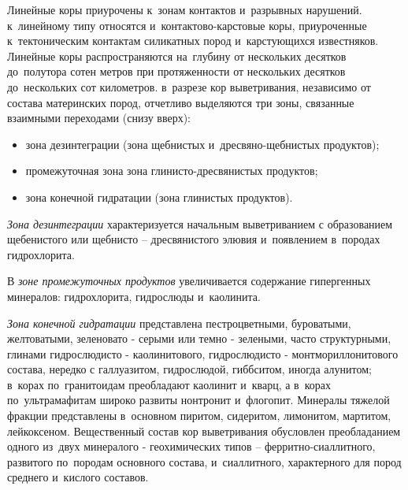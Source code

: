 Линейные коры приурочены к~зонам контактов и~разрывных нарушений. к~линейному типу относятся и~контактово-карстовые коры, приуроченные к~тектоническим контактам силикатных пород и~карстующихся
известняков. Линейные коры распространяются на~глубину от нескольких десятков до~полутора сотен метров при протяженности от нескольких десятков до~нескольких сот километров. в~разрезе кор выветривания, независимо от состава материнских пород, отчетливо выделяются три зоны, связанные взаимными переходами (снизу вверх): 
\begin{itemize}
\item зона дезинтеграции (зона щебнистых и~дресвяно-щебнистых продуктов);
\item промежуточная зона зона глинисто-дресвянистых продуктов;
\item зона конечной гидратации (зона глинистых продуктов).
\end{itemize}


\textit{Зона дезинтеграции} характеризуется начальным выветриванием с образованием щебенистого или щебнисто -- дресвянистого элювия и~появлением в~породах гидрохлорита. 

В \textit{зоне промежуточных продуктов} увеличивается содержание гипергенных минералов: гидрохлорита, гидрослюды и~каолинита. 

\textit{Зона конечной гидратации} представлена пестроцветными, буроватыми, желтоватыми, зеленовато - серыми или темно - зелеными, часто структурными, глинами гидрослюдисто - каолинитового, гидрослюдисто - монтмориллонитового состава, нередко с галлуазитом, гидрослюдой, гиббситом, иногда алунитом; в~корах по~гранитоидам преобладают каолинит и~кварц, а в~корах по~ультрамафитам широко развиты нонтронит и~флогопит. Минералы тяжелой фракции представлены в~основном пиритом, сидеритом, лимонитом, мартитом, лейкоксеном. Вещественный состав кор выветривания обусловлен преобладанием одного из~двух минералого - геохимических типов  --  ферритно-сиаллитного, развитого по~породам основного состава, и~сиаллитного, характерного для пород среднего и~кислого составов.

